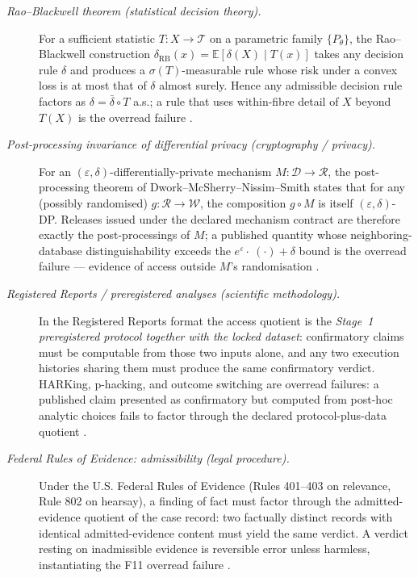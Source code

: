 \documentclass[11pt]{article}
\theoremstyle{definition}
\begin{document}
\begin{description}
\item[\emph{Rao--Blackwell theorem (statistical decision theory).}]
For a sufficient statistic \(T:X\to\mathcal T\) on a parametric
family \(\{P_\theta\}\), the Rao--Blackwell construction
\(\delta_{\mathrm{RB}}(x)=\mathbb E[\delta(X)\mid T(x)]\) takes any
decision rule \(\delta\) and produces a \(\sigma(T)\)-measurable
rule whose risk under a convex loss is at most that of \(\delta\)
almost surely.  Hence any admissible decision rule factors as
\(\delta=\bar\delta\circ T\) a.s.; a rule that uses within-fibre
detail of \(X\) beyond \(T(X)\) is the overread failure
\citep{Blackwell1947ConditionalExpectation}.

\item[\emph{Post-processing invariance of differential privacy
(cryptography / privacy).}]
For an \((\varepsilon,\delta)\)-differentially-private mechanism
\(M:\mathcal D\to\mathcal R\), the post-processing theorem of
Dwork--McSherry--Nissim--Smith states that for any (possibly
randomised) \(g:\mathcal R\to\mathcal W\), the composition
\(g\circ M\) is itself \((\varepsilon,\delta)\)-DP.  Releases
issued under the declared mechanism contract are therefore exactly
the post-processings of \(M\); a published quantity whose
neighboring-database distinguishability exceeds the
\(e^{\varepsilon}\!\cdot\!\!\ (\cdot)+\delta\) bound is the
overread failure --- evidence of access outside \(M\)'s
randomisation
\citep{DworkMcSherryNissimSmith2006CalibratingNoise}.

\item[\emph{Registered Reports / preregistered analyses (scientific
methodology).}]
In the Registered Reports format the access quotient is the
\emph{Stage~1 preregistered protocol together with the locked
dataset}: confirmatory claims must be computable from those two
inputs alone, and any two execution histories sharing them must
produce the same confirmatory verdict.  HARKing, p-hacking, and
outcome switching are overread failures: a published claim
presented as confirmatory but computed from post-hoc analytic
choices fails to factor through the declared protocol-plus-data
quotient
\citep{Chambers2013RegisteredReports}.

\item[\emph{Federal Rules of Evidence: admissibility (legal
procedure).}]
Under the U.S. Federal Rules of Evidence (Rules 401--403 on
relevance, Rule 802 on hearsay), a finding of fact must factor
through the admitted-evidence quotient of the case record: two
factually distinct records with identical admitted-evidence content
must yield the same verdict.  A verdict resting on inadmissible
evidence is reversible error unless harmless, instantiating the
F11 overread failure
\citep{FRE2024FederalRulesEvidence}.


\end{description}
\end{document}
